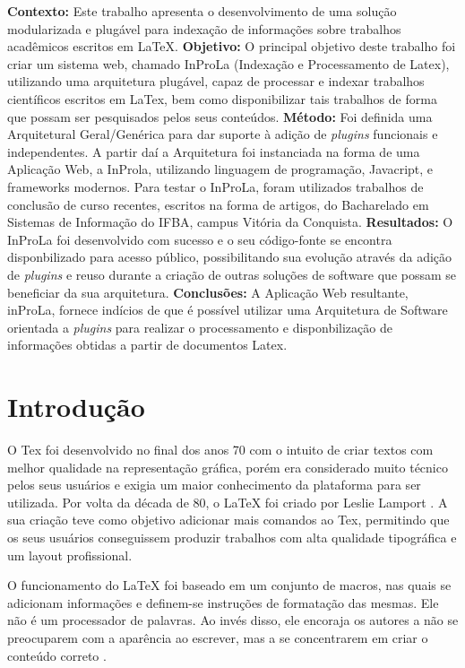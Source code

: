 \documentclass[12pt]{article}
\begin{document}
\begin{resumo} 
\textbf{Contexto:} Este trabalho apresenta o desenvolvimento de uma solução modularizada e plugável para indexação de informações sobre trabalhos acadêmicos escritos em LaTeX. \textbf{Objetivo:} O principal objetivo deste trabalho foi criar um sistema web, chamado InProLa (Indexação e Processamento de Latex), utilizando uma arquitetura plugável, capaz de processar e indexar trabalhos científicos escritos em LaTex, bem como disponibilizar tais trabalhos de forma que possam ser pesquisados pelos seus conteúdos. \textbf{Método:} Foi definida uma Arquitetural Geral/Genérica para dar suporte à adição de \textit{plugins} funcionais e independentes. A partir daí a Arquitetura foi instanciada na forma de uma Aplicação Web, a InProla, utilizando linguagem de programação, Javacript, e frameworks modernos. Para testar o InProLa, foram utilizados trabalhos de conclusão de curso recentes, escritos na forma de artigos, do Bacharelado em Sistemas de Informação do IFBA, campus Vitória da Conquista. \textbf{Resultados:} O InProLa foi desenvolvido com sucesso e o seu código-fonte se encontra disponbilizado para acesso público, possibilitando sua evolução através da adição de \textit{plugins} e reuso durante a criação de outras soluções de software que possam se beneficiar da sua arquitetura. \textbf{Conclusões:} A Aplicação Web resultante, inProLa, fornece indícios de que é possível utilizar uma Arquitetura de Software orientada a \textit{plugins} para realizar o processamento e disponbilização de informações obtidas a partir de documentos Latex.
\end{resumo}

\section{Introdução}

O Tex foi desenvolvido no final dos anos 70 com o intuito de criar textos com melhor qualidade na representação gráfica, porém era considerado muito técnico pelos seus usuários e exigia um maior conhecimento da plataforma para ser utilizada. Por volta da década de 80, o LaTeX foi criado por Leslie Lamport \cite{alonso2019}. A sua criação teve como objetivo adicionar mais comandos ao Tex, permitindo que os seus usuários conseguissem produzir trabalhos com alta qualidade tipográfica e um layout profissional.

O funcionamento do LaTeX foi baseado em um conjunto de macros, nas quais se adicionam informações e definem-se instruções de formatação das mesmas. Ele não é um processador de palavras. Ao invés disso, ele encoraja os autores a não se preocuparem com a aparência ao escrever, mas a se concentrarem em criar o conteúdo correto \cite{theLatexProject}.
\end{document}
